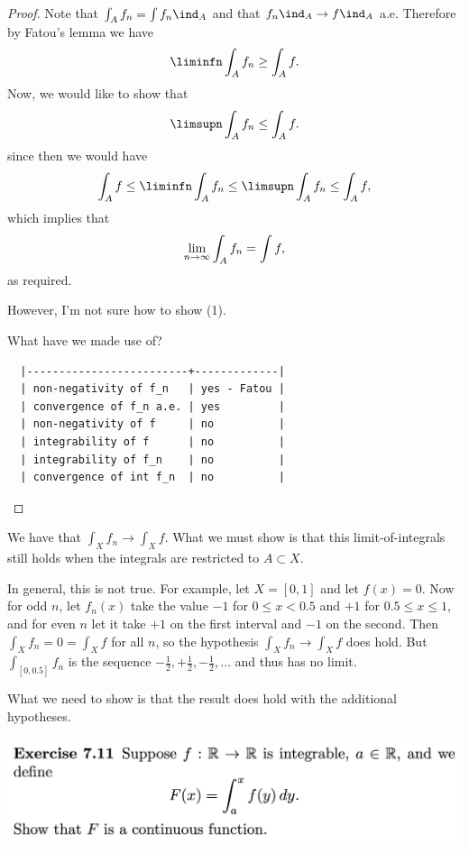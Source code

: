 \begin{proof}
  Note that $\int_A f_n = \int f_n\ind_A$ and that $f_n\ind_A \to f\ind_A$ a.e. Therefore by Fatou's lemma we have
  \begin{align*}
    \liminfn \int_A f_n \geq \int_A f.
  \end{align*}
  Now, we would like to show that
  \begin{align}
    \limsupn \int_A f_n \leq \int_A f.
  \end{align}
  since then we would have
  \begin{align*}
    \int_A f \leq \liminfn \int_A f_n \leq \limsupn \int_A f_n \leq \int_A f,
  \end{align*}
  which implies that
  \begin{align*}
    \limn \int_A f_n = \int f,
  \end{align*}
  as required.

  However, I'm not sure how to show (1).

  What have we made use of?
\begin{verbatim}
  |-------------------------+-------------|
  | non-negativity of f_n   | yes - Fatou |
  | convergence of f_n a.e. | yes         |
  | non-negativity of f     | no          |
  | integrability of f      | no          |
  | integrability of f_n    | no          |
  | convergence of int f_n  | no          |
\end{verbatim}
\end{proof}

\begin{remark*}
  We have that $\int_X f_n \to \int_X f$. What we must show is that this limit-of-integrals still holds when
  the integrals are restricted to $A \subset X$.

  In general, this is not true. For example, let $X = [0, 1]$ and let $f(x) = 0$. Now for odd $n$, let $f_n(x)$
  take the value $-1$ for $0 \leq x < 0.5$ and $+1$ for $0.5 \leq x \leq 1$, and for even $n$ let it take $+1$
  on the first interval and $-1$ on the second. Then $\int_X f_n = 0 = \int_X f$ for all $n$, so the
  hypothesis $\int_X f_n \to \int_X f$ does hold. But $\int_{[0, 0.5]} f_n$ is the
  sequence $-\frac{1}{2}, +\frac{1}{2}, -\frac{1}{2}, \ldots$ and thus has no limit.

  What we need to show is that the result does hold with the additional hypotheses.
\end{remark*}



\begin{mdframed}
\includegraphics[width=400pt]{img/analysis--berkeley-202a-hw08-d0c0.png}
\end{mdframed}

